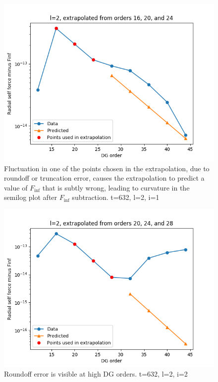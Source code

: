 \begin{figure}
  \includegraphics{extrapolate7t632l2i1}
  \caption{Fluctuation in one of the points chosen in the extrapolation, due to roundoff or truncation error, causes the extrapolation to predict a value of $F_{\inf}$ that is subtly wrong, leading to curvature in the semilog plot after $F_{\inf}$ subtraction. t=632, l=2, i=1}
\end{figure}

\begin{figure}
  \includegraphics{extrapolate7t632l2i2}
  \caption{Roundoff error is visible at high DG orders. t=632, l=2, i=2}
\end{figure}

